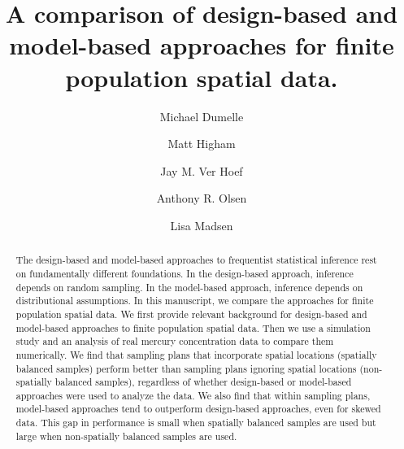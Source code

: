 \documentclass[]{elsarticle} %
\begin{document}
\begin{frontmatter}

  \title{A comparison of design-based and model-based approaches for finite
population spatial data.}
    \author[USEPA]{Michael Dumelle}
  
    \author[STLAW]{Matt Higham}
  
    \author[NOAA]{Jay M. Ver Hoef}
  
    \author[USEPA]{Anthony R. Olsen}
  
    \author[OSU]{Lisa Madsen}
  
      \address[USEPA]{United States Environmental Protection Agency, 200 SW 35th St,
Corvallis, Oregon, 97333}
    \address[STLAW]{Saint Lawrence University Department of Mathematics, Computer Science,
and Statistics, 23 Romoda Drive, Canton, New York, 13617}
    \address[NOAA]{Marine Mammal Laboratory, Alaska Fisheries Science Center, National
Oceanic and Atmospheric Administration, Seattle, Washington, 98115}
    \address[OSU]{Oregon State University Department of Statistics, 239 Weniger Hall,
Corvallis, Oregon, 97331}
  
  \begin{abstract}
  The design-based and model-based approaches to frequentist statistical
  inference rest on fundamentally different foundations. In the
  design-based approach, inference depends on random sampling. In the
  model-based approach, inference depends on distributional assumptions.
  In this manuscript, we compare the approaches for finite population
  spatial data. We first provide relevant background for design-based and
  model-based approaches to finite population spatial data. Then we use a
  simulation study and an analysis of real mercury concentration data to
  compare them numerically. We find that sampling plans that incorporate
  spatial locations (spatially balanced samples) perform better than
  sampling plans ignoring spatial locations (non-spatially balanced
  samples), regardless of whether design-based or model-based approaches
  were used to analyze the data. We also find that within sampling plans,
  model-based approaches tend to outperform design-based approaches, even
  for skewed data. This gap in performance is small when spatially
  balanced samples are used but large when non-spatially balanced samples
  are used.
  \end{abstract}
  
 \end{frontmatter}
\end{document}
